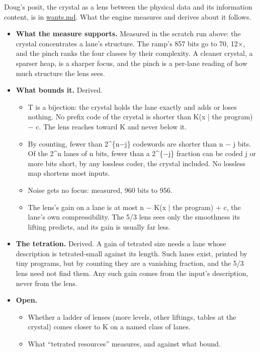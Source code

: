 Doug's posit, the crystal as a lens between the physical data and its information content, is in \hyperref[chap:wants]{wants.md}. What the engine measures and derives about it follows.

\begin{itemize}
\item \textbf{What the measure supports.} Measured in the scratch run above: the crystal concentrates a lane's structure. The ramp's 857 bits go to 70, 12×, and the pinch ranks the four classes by their complexity. A cleaner crystal, a sparser heap, is a sharper focus, and the pinch is a per-lane reading of how much structure the lens sees.
\item \textbf{What bounds it.} Derived.

\begin{itemize}
\item T is a bijection: the crystal holds the lane exactly and adds or loses nothing. No prefix code of the crystal is shorter than K(x | the program) − c. The lens reaches toward K and never below it.
\item By counting, fewer than 2\textasciicircum{}\{n−j\} codewords are shorter than n − j bits. Of the 2\textasciicircum{}n lanes of n bits, fewer than a 2\textasciicircum{}\{−j\} fraction can be coded j or more bits short, by any lossless coder, the crystal included. No lossless map shortens most inputs.
\item Noise gets no focus: measured, 960 bits to 956.
\item The lens's gain on a lane is at most n − K(x | the program) + c, the lane's own compressibility. The 5/3 lens sees only the smoothness its lifting predicts, and its gain is usually far less.
\end{itemize}
\item \textbf{The tetration.} Derived. A gain of tetrated size needs a lane whose description is tetrated-small against its length. Such lanes exist, printed by tiny programs, but by counting they are a vanishing fraction, and the 5/3 lens need not find them. Any such gain comes from the input's description, never from the lens.
\item \textbf{Open.}

\begin{itemize}
\item Whether a ladder of lenses (more levels, other liftings, tables at the crystal) comes closer to K on a named class of lanes.
\item What “tetrated resources” measures, and against what bound.
\end{itemize}
\end{itemize}

